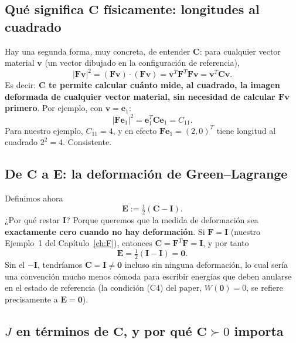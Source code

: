 \documentclass[11pt,a4paper]{article}
\begin{document}
\subsection{Qu\'e significa $\bm C$ f\'isicamente: longitudes al cuadrado}

Hay una segunda forma, muy concreta, de entender $\bm C$: para
cualquier vector material $\bm v$ (un vector dibujado en la
configuraci\'on de referencia),
\begin{equation}
 |\bm F\bm v|^2 = (\bm F\bm v)\cdot(\bm F\bm v) = \bm v^T\bm F^T\bm F\bm v = \bm v^T\bm C\bm v.
 \label{eq:appB-C-lengths}
\end{equation}
Es decir: \textbf{$\bm C$ te permite calcular cu\'anto mide, al
cuadrado, la imagen deformada de cualquier vector material, sin
necesidad de calcular $\bm F\bm v$ primero}. Por ejemplo, con
$\bm v=\bm e_1$:
\[
 |\bm F\bm e_1|^2=\bm e_1^T\bm C\bm e_1=C_{11}.
\]
Para nuestro ejemplo, $C_{11}=4$, y en efecto
$\bm F\bm e_1=(2,0)^T$ tiene longitud al cuadrado $2^2=4$. Consistente.

\subsection{De $\bm C$ a $\bm E$: la deformaci\'on de Green--Lagrange}

Definimos ahora
\begin{equation}
 \bm E:=\tfrac12(\bm C-\bm I).
 \label{eq:appB-E-def}
\end{equation}
¿Por qu\'e restar $\bm I$? Porque queremos que la medida de
deformaci\'on sea \textbf{exactamente cero cuando no hay
deformaci\'on}. Si $\bm F=\bm I$ (nuestro Ejemplo~1 del
Cap\'itulo~\ref{ch:F}), entonces $\bm C=\bm F^T\bm F=\bm I$, y por
tanto
\[
 \bm E=\tfrac12(\bm I-\bm I)=\bm 0.
\]
Sin el $-\bm I$, tendr\'iamos $\bm C=\bm I\neq\bm 0$ incluso sin
ninguna deformaci\'on, lo cual ser\'ia una convenci\'on mucho menos
c\'omoda para escribir energ\'ias que deben anularse en el estado de
referencia (la condici\'on (C4) del paper, $W(\bm 0)=0$, se refiere
precisamente a $\bm E=\bm 0$).

\subsection{$J$ en t\'erminos de $\bm C$, y por qu\'e $\bm C\succ0$ importa}
\end{document}

